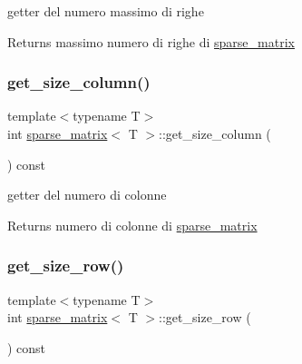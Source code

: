 getter del numero massimo di righe 

\begin{DoxyReturn}{Returns}
massimo numero di righe di \hyperlink{classsparse__matrix}{sparse\+\_\+matrix} 
\end{DoxyReturn}
\mbox{\label{classsparse__matrix_aca943521574c4c5b5d9c73e6ea897e37}} 
\subsubsection{\texorpdfstring{get\+\_\+size\+\_\+column()}{get\_size\_column()}}
{\footnotesize\ttfamily template$<$typename T$>$ \\
int \hyperlink{classsparse__matrix}{sparse\+\_\+matrix}$<$ T $>$\+::get\+\_\+size\+\_\+column (\begin{DoxyParamCaption}{ }\end{DoxyParamCaption}) const\hspace{0.3cm}{\ttfamily [inline]}}



getter del numero di colonne 

\begin{DoxyReturn}{Returns}
numero di colonne di \hyperlink{classsparse__matrix}{sparse\+\_\+matrix} 
\end{DoxyReturn}
\mbox{\label{classsparse__matrix_ab6b17669a2fa27844d62948b6c5a0bc9}} 
\subsubsection{\texorpdfstring{get\+\_\+size\+\_\+row()}{get\_size\_row()}}
{\footnotesize\ttfamily template$<$typename T$>$ \\
int \hyperlink{classsparse__matrix}{sparse\+\_\+matrix}$<$ T $>$\+::get\+\_\+size\+\_\+row (\begin{DoxyParamCaption}{ }\end{DoxyParamCaption}) const\hspace{0.3cm}{\ttfamily [inline]}}




